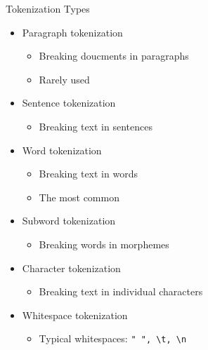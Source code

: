 \documentclass[11pt,compress,t,notes=noshow, xcolor=table]{beamer}
\begin{document}
\begin{vbframe}{Tokenization Types}

\vfill

\begin{itemize}
	\item Paragraph tokenization 
		\begin{itemize}
			\item Breaking doucments in paragraphs 
			\item Rarely used
		\end{itemize}
		\item Sentence tokenization 
			\begin{itemize}
				\item Breaking text in sentences 
			\end{itemize}
		\item Word tokenization
			\begin{itemize}
				\item Breaking text in words
				\item The most common
			\end{itemize}
	\item Subword tokenization
		\begin{itemize}
			\item Breaking words in morphemes
		\end{itemize}
	\item Character tokenization
		\begin{itemize}
			\item Breaking text in individual characters
		\end{itemize}
	\item Whitespace tokenization
		\begin{itemize}
			\item Typical whitespaces: \verb|" ", \t, \n|
		\end{itemize}
\end{itemize}

\vfill

\end{vbframe}

\end{document}
